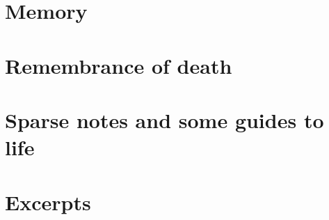 \documentclass[a4paper,12pt,twoside]{book}
\begin{document}
\chapter{Memory}






\chapter{Remembrance of death}



\chapter{Sparse notes and some guides to life}













\chapter{Excerpts}

\end{document}
